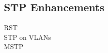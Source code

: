 \documentclass{article}
\begin{document}
\subsection{STP Enhancements}

\begin{description}
   	\item[RST] 
   	\item[STP on VLANs]
   	\item[MSTP]
\end{description}




\newpage








\printbibliography
\end{document}

